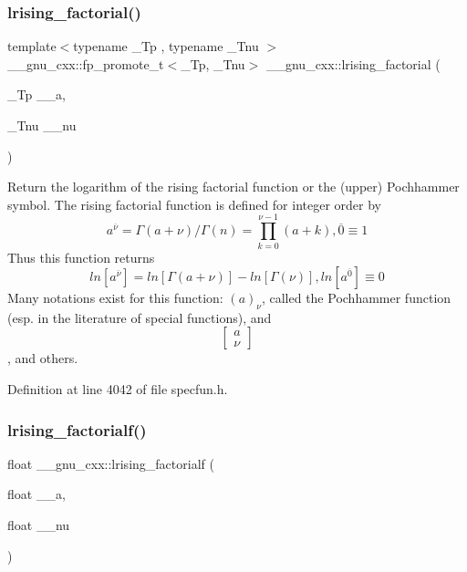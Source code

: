 \subsubsection{\texorpdfstring{lrising\+\_\+factorial()}{lrising\_factorial()}}
{\footnotesize\ttfamily template$<$typename \+\_\+\+Tp , typename \+\_\+\+Tnu $>$ \\
\+\_\+\+\_\+gnu\+\_\+cxx\+::fp\+\_\+promote\+\_\+t$<$\+\_\+\+Tp, \+\_\+\+Tnu$>$ \+\_\+\+\_\+gnu\+\_\+cxx\+::lrising\+\_\+factorial (\begin{DoxyParamCaption}\item[{\+\_\+\+Tp}]{\+\_\+\+\_\+a,  }\item[{\+\_\+\+Tnu}]{\+\_\+\+\_\+nu }\end{DoxyParamCaption})\hspace{0.3cm}{\ttfamily [inline]}}



Return the logarithm of the rising factorial function or the (upper) Pochhammer symbol. The rising factorial function is defined for integer order by \[ a^{\overline{\nu}} = \Gamma(a + \nu) / \Gamma(n) = \prod_{k=0}^{\nu-1} (a + k), \overline{0} \equiv 1 \] Thus this function returns \[ ln[a^{\overline{\nu}}] = ln[\Gamma(a + \nu)] - ln[\Gamma(\nu)], ln[a^{\overline{0}}] \equiv 0 \] Many notations exist for this function\+: $ (a)_\nu $, called the Pochhammer function (esp. in the literature of special functions), and \[ \left[ \begin{array}{c} a \\ \nu \end{array} \right] \], and others. 



Definition at line 4042 of file specfun.\+h.

\mbox{\label{group__mathsf__gnu_ga68c64f4e44d03b5b3f75f90dbe2e0819}} 
\subsubsection{\texorpdfstring{lrising\+\_\+factorialf()}{lrising\_factorialf()}}
{\footnotesize\ttfamily float \+\_\+\+\_\+gnu\+\_\+cxx\+::lrising\+\_\+factorialf (\begin{DoxyParamCaption}\item[{float}]{\+\_\+\+\_\+a,  }\item[{float}]{\+\_\+\+\_\+nu }\end{DoxyParamCaption})\hspace{0.3cm}{\ttfamily [inline]}}


